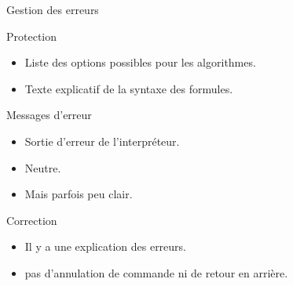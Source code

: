 \begin{frame}{Gestion des erreurs}
  \begin{block}{Protection}
    \begin{itemize}
    \item<pro@1-> Liste des options possibles pour les algorithmes.
    \item Texte explicatif de la syntaxe des formules.
    \end{itemize}
  \end{block}

  \begin{block}{Messages d'erreur}
    \begin{itemize}
    \item Sortie d'erreur de l'interpréteur.
    \item Neutre.
    \item<con@1-> Mais parfois peu clair.
    \end{itemize}
  \end{block}

  \begin{block}{Correction}
    \begin{itemize}
    \item Il y a une explication des erreurs.
    \item pas d'annulation de commande ni de retour en arrière.
    \end{itemize}
  \end{block}
\end{frame}
